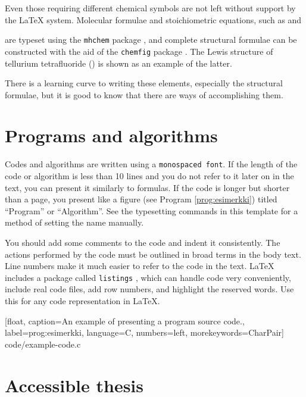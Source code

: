 Even those requiring different chemical symbols are not left without support by the \LaTeX{} system. Molecular formulae and stoichiometric equations, such as  and
\begin{center}
\end{center}
are typeset using the \texttt{mhchem} package \parencite{mhchem}, and complete structural formulae can be constructed with the aid of the \texttt{chemfig} package \parencite{chemfig}. The Lewis structure of tellurium tetrafluoride () is shown as an example of the latter.
\begin{center}
\end{center}
There is a learning curve to writing these elements, especially the structural formulae, but it is good to know that there are ways of accomplishing them.

\section{Programs and algorithms}

Codes and algorithms are written using a \texttt{monospaced font}. If the length of the code or algorithm is less than 10 lines and you do not refer to it later on in the text, you can present it similarly to formulas. If the code is longer but shorter than a page, you present like a figure (see Program \ref{prog:esimerkki}) titled ``Program'' or ``Algorithm''. See the typesetting commands in this template for a method of setting the name manually.

You should add some comments to the code and indent it consistently. The actions performed by the code must be outlined in broad terms in the body text. Line numbers make it much easier to refer to the code in the text. \LaTeX{} includes a package called \texttt{listings} \parencite{listings,notsoshort}, which can handle code very conveniently, include real code files, add row numbers, and highlight the reserved words. Use this for any code representation in \LaTeX.

\renewcommand{\lstlistingname}{Program}

    [float,
    caption={An example of presenting a program source code.},
    label=prog:esimerkki,
    language=C,
    numbers=left,
    morekeywords={CharPair}]
    {code/example-code.c}

\section{Accessible thesis}

